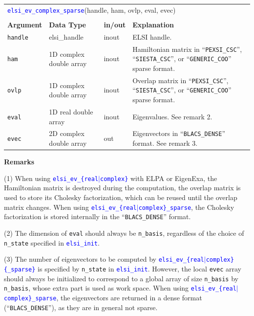\documentclass{report}
\newcommand{\api}[1]{\textcolor{blue}{\texttt{#1}}}
\begin{document}
\begin{tabular}[]{|p{20mm}|p{40mm}|p{10mm}|p{92mm}|}
\multicolumn{4}{l}{\api{elsi\_ev\_complex\_sparse}(handle, ham, ovlp, eval, evec)}\\
\multicolumn{4}{l}{}\\
\hline
\multicolumn{1}{|l|}{\textbf{Argument}} & \multicolumn{1}{l|}{\textbf{Data Type}} & \multicolumn{1}{l|}{\textbf{in/out}} & \multicolumn{1}{l|}{\textbf{Explanation}}\\
\hline
\texttt{handle} & elsi\_handle            & inout & ELSI handle.\\
\hline
\texttt{ham}    & 1D complex double array & inout & Hamiltonian matrix in ``\texttt{PEXSI\_CSC}'', ``\texttt{SIESTA\_CSC}'', or ``\texttt{GENERIC\_COO}'' sparse format.\\
\hline
\texttt{ovlp}   & 1D complex double array & inout & Overlap matrix in ``\texttt{PEXSI\_CSC}'', ``\texttt{SIESTA\_CSC}'', or ``\texttt{GENERIC\_COO}'' sparse format.\\
\hline
\texttt{eval}   & 1D real double array    & inout & Eigenvalues. See remark 2.\\
\hline
\texttt{evec}   & 2D complex double array & out   & Eigenvectors in ``\texttt{BLACS\_DENSE}'' format. See remark 3.\\
\hline
\end{tabular}

\textbf{Remarks}

(1) When using \api{elsi\_ev\_\{real$\vert$complex\}} with ELPA or EigenExa, the Hamiltonian matrix is destroyed during the computation, the overlap matrix is used to store its Cholesky factorization, which can be reused until the overlap matrix changes. When using \api{elsi\_ev\_\{real$\vert$complex\}\_sparse}, the Cholesky factorization is stored internally in the ``\texttt{BLACS\_DENSE}'' format.

(2) The dimension of \texttt{eval} should always be \texttt{n\_basis}, regardless of the choice of \texttt{n\_state} specified in \api{elsi\_init}.

(3) The number of eigenvectors to be computed by \api{elsi\_ev\_\{real$\vert$complex\}\{\_sparse\}} is specified by \texttt{n\_state} in \api{elsi\_init}. However, the local \texttt{evec} array should always be initialized to correspond to a global array of size \texttt{n\_basis} by \texttt{n\_basis}, whose extra part is used as work space. When using \api{elsi\_ev\_\{real$\vert$complex\}\_sparse}, the eigenvectors are returned in a dense format (``\texttt{BLACS\_DENSE}''), as they are in general not sparse.
\end{document}
